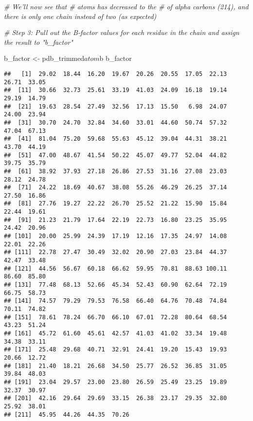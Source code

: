 \documentclass[]{article}
\newenvironment{Shaded}{\begin{snugshade}}{\end{snugshade}}
\newcommand{\StringTok}[1]{\textcolor[rgb]{0.31,0.60,0.02}{{#1}}}
\newcommand{\CommentTok}[1]{\textcolor[rgb]{0.56,0.35,0.01}{\textit{{#1}}}}
\newcommand{\NormalTok}[1]{{#1}}
\begin{document}
\begin{Shaded}
\begin{Highlighting}[]
\CommentTok{# We'll now see that # atoms has decreased to the # of alpha carbons (214), and there is only one chain instead of two (as expected)}
\end{Highlighting}
\end{Shaded}

\begin{Shaded}
\begin{Highlighting}[]
\CommentTok{# Step 3: Pull out the B-factor values for each residue in the chain and assign the result to "b_factor"}

\NormalTok{b_factor <-}\StringTok{ }\NormalTok{pdb_trimmed$atom$b}
\NormalTok{b_factor}
\end{Highlighting}
\end{Shaded}

\begin{verbatim}
##   [1]  29.02  18.44  16.20  19.67  20.26  20.55  17.05  22.13  26.71  33.05
##  [11]  30.66  32.73  25.61  33.19  41.03  24.09  16.18  19.14  29.19  14.79
##  [21]  19.63  28.54  27.49  32.56  17.13  15.50   6.98  24.07  24.00  23.94
##  [31]  30.70  24.70  32.84  34.60  33.01  44.60  50.74  57.32  47.04  67.13
##  [41]  81.04  75.20  59.68  55.63  45.12  39.04  44.31  38.21  43.70  44.19
##  [51]  47.00  48.67  41.54  50.22  45.07  49.77  52.04  44.82  39.75  35.79
##  [61]  38.92  37.93  27.18  26.86  27.53  31.16  27.08  23.03  28.12  24.78
##  [71]  24.22  18.69  40.67  38.08  55.26  46.29  26.25  37.14  27.50  16.86
##  [81]  27.76  19.27  22.22  26.70  25.52  21.22  15.90  15.84  22.44  19.61
##  [91]  21.23  21.79  17.64  22.19  22.73  16.80  23.25  35.95  24.42  20.96
## [101]  20.00  25.99  24.39  17.19  12.16  17.35  24.97  14.08  22.01  22.26
## [111]  22.78  27.47  30.49  32.02  20.90  27.03  23.84  44.37  42.47  33.48
## [121]  44.56  56.67  60.18  66.62  59.95  70.81  88.63 100.11  86.60  85.80
## [131]  77.48  68.13  52.66  45.34  52.43  60.90  62.64  72.19  66.75  58.73
## [141]  74.57  79.29  79.53  76.58  66.40  64.76  70.48  74.84  70.11  74.82
## [151]  78.61  78.24  66.70  66.10  67.01  72.28  80.64  68.54  43.23  51.24
## [161]  45.72  61.60  45.61  42.57  41.03  41.02  33.34  19.48  34.38  33.11
## [171]  25.48  29.68  40.71  32.91  24.41  19.20  15.43  19.93  20.66  12.72
## [181]  21.40  18.21  26.68  34.50  25.77  26.52  36.85  31.05  39.84  48.03
## [191]  23.04  29.57  23.00  23.80  26.59  25.49  23.25  19.89  32.37  30.97
## [201]  42.16  29.64  29.69  33.15  26.38  23.17  29.35  32.80  25.92  38.01
## [211]  45.95  44.26  44.35  70.26
\end{verbatim}
\end{document}
